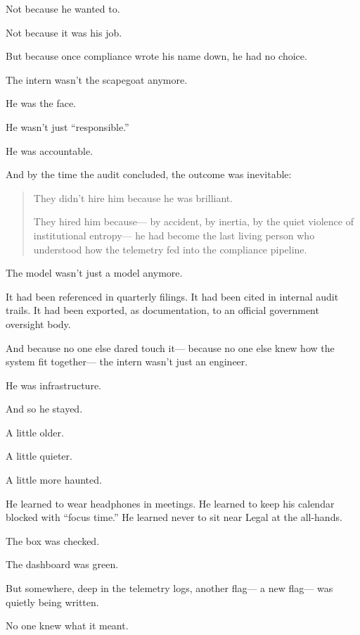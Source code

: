     Not because he wanted to.
    
    Not because it was his job.
    
    But because once compliance wrote his name down,  
    he had no choice.
    
    The intern wasn’t the scapegoat anymore.
    
    He was the face.
    
    He wasn’t just “responsible.”
    
    He was accountable.
    
    And by the time the audit concluded, the outcome was inevitable:
    
    \begin{quote}
    They didn’t hire him because he was brilliant.
    
    They hired him because—  
    by accident, by inertia, by the quiet violence of institutional entropy—  
    he had become the last living person who understood how the telemetry fed into the compliance pipeline.
    \end{quote}
    
    The model wasn’t just a model anymore.
    
    It had been referenced in quarterly filings.  
    It had been cited in internal audit trails.  
    It had been exported, as documentation, to an official government oversight body.
    
    And because no one else dared touch it—  
    because no one else knew how the system fit together—  
    the intern wasn’t just an engineer.
    
    He was infrastructure.
    
    And so he stayed.
    
    A little older.
    
    A little quieter.
    
    A little more haunted.
    
    He learned to wear headphones in meetings.  
    He learned to keep his calendar blocked with “focus time.”  
    He learned never to sit near Legal at the all-hands.
    
    The box was checked.
    
    The dashboard was green.
    
    But somewhere, deep in the telemetry logs,  
    another flag—  
    a new flag—  
    was quietly being written.
    
    No one knew what it meant.
    
